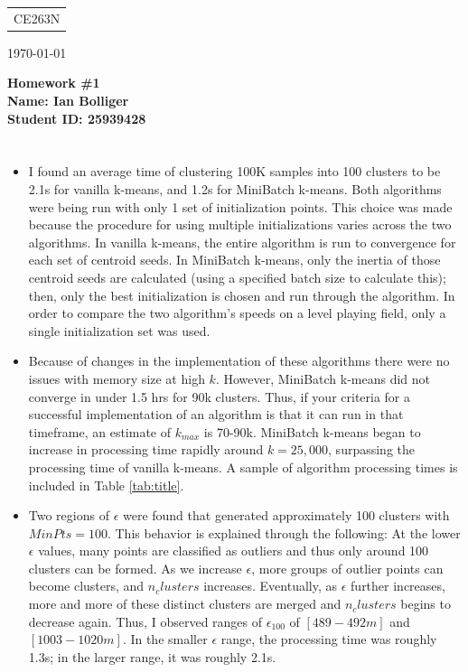 \documentclass[12pt]{article}
\begin{document}
{\parindent 0pt \begin{tabular}[t]{l}
CE263N \\
\end{tabular}  \hfill \today \vskip 0.2in }

\parindent 0pt
\parskip 8pt

\begin{center}
\large\bf Homework \#1 \\
\large\bf Name: \textnormal{Ian Bolliger}\\
\large\bf Student ID: \textnormal{25939428}\\
\end{center}

\bigskip

\section{}
	\begin{itemize}
		\item I found an average time of clustering 100K samples into 100 clusters to be 2.1s for vanilla k-means, and 1.2s for MiniBatch k-means. Both algorithms were being run with only 1 set of initialization points. This choice was made because the procedure for using multiple initializations varies across the two algorithms. In vanilla k-means, the entire algorithm is run to convergence for each set of centroid seeds. In MiniBatch k-means, only the inertia of those centroid seeds are calculated (using a specified batch size to calculate this); then, only the best initialization is chosen and run through the algorithm. In order to compare the two algorithm's speeds on a level playing field, only a single initialization set was used.
		
		\item Because of changes in the implementation of these algorithms there were no issues with memory size at high $k$. However, MiniBatch k-means did not converge in under 1.5 hrs for 90k clusters. Thus, if your criteria for a successful implementation of an algorithm is that it can run in that timeframe, an estimate of $k_{max}$ is 70-90k. MiniBatch k-means began to increase in processing time rapidly around $k=25,000$, surpassing the processing time of vanilla k-means. A sample of algorithm processing times is included in Table \ref{tab:title}.
		
		\item Two regions of $\epsilon$ were found that generated approximately 100 clusters with $MinPts = 100$. This behavior is explained through the following: At the lower $\epsilon$ values, many points are classified as outliers and thus only around 100 clusters can be formed. As we increase $\epsilon$, more groups of outlier points can become clusters, and $n_clusters$ increases. Eventually, as $\epsilon$ further increases, more and more of these distinct clusters are merged and $n_clusters$ begins to decrease again. Thus, I observed ranges of $\epsilon_{100}$ of $[489-492m]$ and $[1003-1020m]$. In the smaller $\epsilon$ range, the processing time was roughly 1.3s; in the larger range, it was roughly 2.1s.
	\end{itemize}
\end{document}
